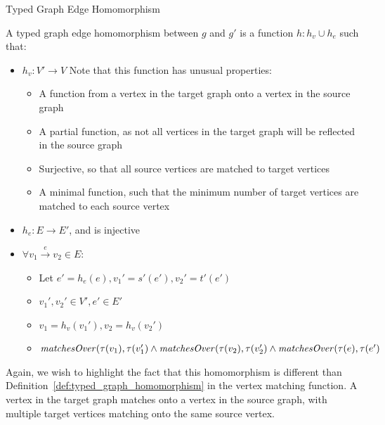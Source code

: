 \begin{definition}{Typed Graph Edge Homomorphism\\}
\label{def:typed_graph_edge_homomorphism}

A typed graph edge homomorphism between $g$ and $g'$ is a function $h: h_v \cup h_e$ such that:
\begin{itemize}
\item $h_v: V'\rightarrow V$ Note that this function has unusual properties:
\begin{itemize}

\item A function from a vertex in the target graph onto a vertex in the source graph
\item A partial function, as not all vertices in the target graph will be reflected in the source graph
\item Surjective, so that all source vertices are matched to target vertices
\item A minimal function, such that the minimum number of target vertices are matched to each source vertex 
\end{itemize}
\item $h_e: E\rightarrow E'$, and is injective
\item $\forall v_1 \xrightarrow{e} v_2\in E$:
\begin{itemize}
\item Let $e' = h_e(e), v_1' = s'(e'), v_2' = t'(e')$
\item $v_1', v_2' \in V', e' \in E'$
\item $v_1 = h_v(v_1'), v_2 = h_v(v_2')$
\item $\mathit{matchesOver}(\tau(v_1), \tau(v_1') \land \\\mathit{matchesOver}(\tau(v_2), \tau(v_2') \land\\ \mathit{matchesOver}(\tau(e), \tau(e')$
\end{itemize}
 
\end{itemize}  
\end{definition}

Again, we wish to highlight the fact that this homomorphism is different than Definition~\ref{def:typed_graph_homomorphism} in the vertex matching function. A vertex in the target graph matches onto a vertex in the source graph, with multiple target vertices matching onto the same source vertex. 

